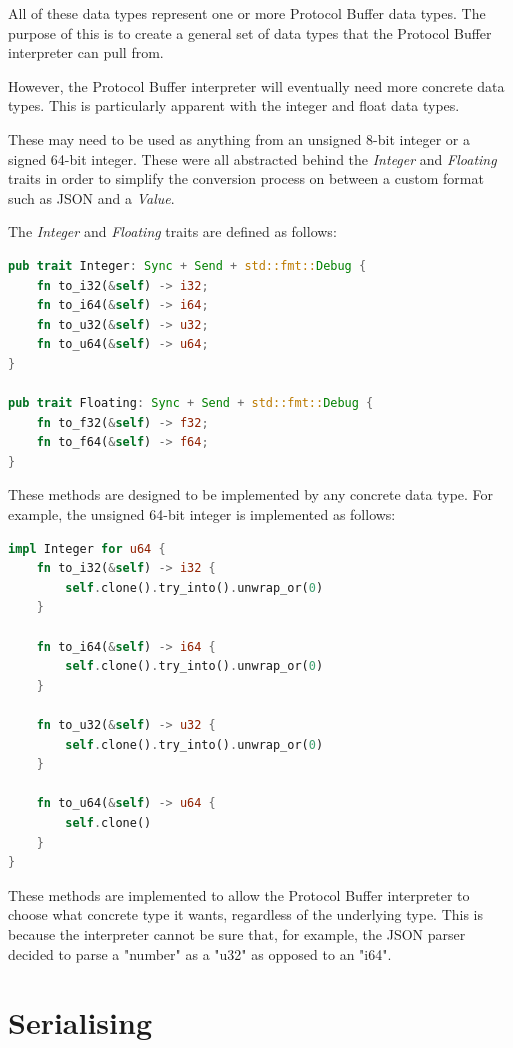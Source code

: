 \documentclass[a4paper,12pt]{report}
\begin{document}
All of these data types represent one or more Protocol Buffer data types. The purpose of this is to create a general set of data types that the 
Protocol Buffer interpreter can pull from.

However, the Protocol Buffer interpreter will eventually need more concrete data types. This is particularly apparent with the integer and float data types.

These may need to be used as anything from an unsigned 8-bit integer or a signed 64-bit integer. 
These were all abstracted behind the \textit{Integer} and \textit{Floating} traits in order to simplify the conversion process on between a custom format such as JSON and a \textit{Value}.

The \textit{Integer} and \textit{Floating} traits are defined as follows:

\begin{lstlisting}[language=Rust]
pub trait Integer: Sync + Send + std::fmt::Debug {
    fn to_i32(&self) -> i32;
    fn to_i64(&self) -> i64;
    fn to_u32(&self) -> u32;
    fn to_u64(&self) -> u64;
}

pub trait Floating: Sync + Send + std::fmt::Debug {
    fn to_f32(&self) -> f32;
    fn to_f64(&self) -> f64;
}
\end{lstlisting}

These methods are designed to be implemented by any concrete data type. For example, the unsigned 64-bit integer is implemented as follows:

\begin{lstlisting}[language=Rust]
impl Integer for u64 {
    fn to_i32(&self) -> i32 {
        self.clone().try_into().unwrap_or(0)
    }

    fn to_i64(&self) -> i64 {
        self.clone().try_into().unwrap_or(0)
    }

    fn to_u32(&self) -> u32 {
        self.clone().try_into().unwrap_or(0)
    }

    fn to_u64(&self) -> u64 {
        self.clone()
    }
}
\end{lstlisting}

These methods are implemented to allow the Protocol Buffer interpreter to choose what concrete type it wants, regardless of the underlying type.
This is because the interpreter cannot be sure that, for example, the JSON parser decided to parse a "number" as a "u32" as opposed to an "i64".

\section{Serialising}
\end{document}
